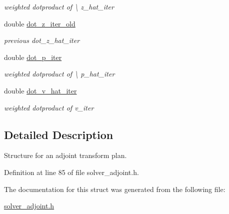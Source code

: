 \begin{DoxyCompactItemize}
\begin{DoxyCompactList}\small\item\em weighted dotproduct of \textbackslash{} z\-\_\-hat\-\_\-iter \end{DoxyCompactList}\item 
\hypertarget{structimri__inh__3d__adjoint__plan_a794d80ffe20e25a4d69340d925d8624c}{double \hyperlink{structimri__inh__3d__adjoint__plan_a794d80ffe20e25a4d69340d925d8624c}{dot\-\_\-z\-\_\-iter\-\_\-old}}\label{structimri__inh__3d__adjoint__plan_a794d80ffe20e25a4d69340d925d8624c}

\begin{DoxyCompactList}\small\item\em previous dot\-\_\-z\-\_\-hat\-\_\-iter \end{DoxyCompactList}\item 
\hypertarget{structimri__inh__3d__adjoint__plan_a65805c60e7d3a18d9a8952da80286032}{double \hyperlink{structimri__inh__3d__adjoint__plan_a65805c60e7d3a18d9a8952da80286032}{dot\-\_\-p\-\_\-iter}}\label{structimri__inh__3d__adjoint__plan_a65805c60e7d3a18d9a8952da80286032}

\begin{DoxyCompactList}\small\item\em weighted dotproduct of \textbackslash{} p\-\_\-hat\-\_\-iter \end{DoxyCompactList}\item 
\hypertarget{structimri__inh__3d__adjoint__plan_ae251b00724c42f9c0f906e823c9e17f8}{double \hyperlink{structimri__inh__3d__adjoint__plan_ae251b00724c42f9c0f906e823c9e17f8}{dot\-\_\-v\-\_\-hat\-\_\-iter}}\label{structimri__inh__3d__adjoint__plan_ae251b00724c42f9c0f906e823c9e17f8}

\begin{DoxyCompactList}\small\item\em weighted dotproduct of v\-\_\-iter \end{DoxyCompactList}\end{DoxyCompactItemize}


\subsection{Detailed Description}
Structure for an adjoint transform plan. 

Definition at line 85 of file solver\-\_\-adjoint.\-h.



The documentation for this struct was generated from the following file\-:\begin{DoxyCompactItemize}
\item 
\hyperlink{solver__adjoint_8h}{solver\-\_\-adjoint.\-h}\end{DoxyCompactItemize}
